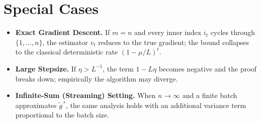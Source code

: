 \documentclass[11pt]{article}
\begin{document}
\section*{Special Cases}
\begin{itemize}
\item \textbf{Exact Gradient Descent.} If $m=n$ and every inner index $i_t$ cycles through $\{1,\dots,n\}$, the estimator $v_t$ reduces to the true gradient; the bound collapses to the classical deterministic rate $(1-\mu/L)^{t}$.
\item \textbf{Large Stepsize.} If $\eta>L^{-1}$, the term $1-L\eta$ becomes negative and the proof breaks down; empirically the algorithm may diverge.
\item \textbf{Infinite‑Sum (Streaming) Setting.} When $n\to\infty$ and a finite batch approximates $\tilde{g}^{\,s}$, the same analysis holds with an additional variance term proportional to the batch size.
\end{itemize}

\end{document}
